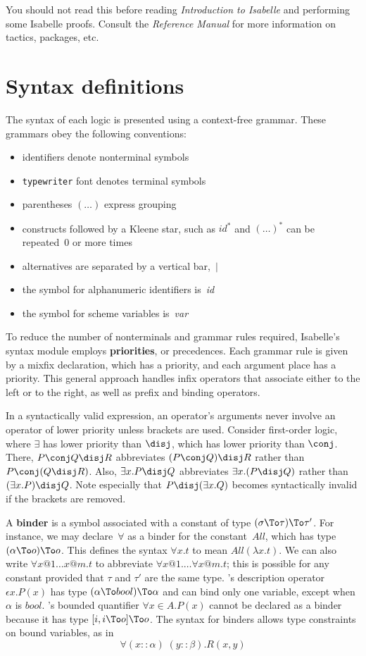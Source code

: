 You should not read this before reading {\em Introduction to Isabelle\/}
and performing some Isabelle proofs.  Consult the {\em Reference Manual}
for more information on tactics, packages, etc.


\section{Syntax definitions}
The syntax of each logic is presented using a context-free grammar.
These grammars obey the following conventions:
\begin{itemize}
\item identifiers denote nonterminal symbols
\item {\tt typewriter} font denotes terminal symbols
\item parentheses $(\ldots)$ express grouping
\item constructs followed by a Kleene star, such as $id^*$ and $(\ldots)^*$
can be repeated~0 or more times 
\item alternatives are separated by a vertical bar,~$|$
\item the symbol for alphanumeric identifiers is~{\it id\/} 
\item the symbol for scheme variables is~{\it var}
\end{itemize}
To reduce the number of nonterminals and grammar rules required, Isabelle's
syntax module employs {\bf priorities}, or precedences.
Each grammar rule is given by a mixfix declaration, which has a priority,
and each argument place has a priority.  This general approach handles
infix operators that associate either to the left or to the right, as well
as prefix and binding operators.

In a syntactically valid expression, an operator's arguments never involve
an operator of lower priority unless brackets are used.  Consider
first-order logic, where $\exists$ has lower priority than $\disj$,
which has lower priority than $\conj$.  There, $P\conj Q \disj R$
abbreviates $(P\conj Q) \disj R$ rather than $P\conj (Q\disj R)$.  Also,
$\exists x.P\disj Q$ abbreviates $\exists x.(P\disj Q)$ rather than
$(\exists x.P)\disj Q$.  Note especially that $P\disj(\exists x.Q)$
becomes syntactically invalid if the brackets are removed.

A {\bf binder} is a symbol associated with a constant of type
$(\sigma\To\tau)\To\tau'$.  For instance, we may declare~$\forall$ as a
binder for the constant~$All$, which has type $(\alpha\To o)\To o$.  This
defines the syntax $\forall x.t$ to mean $All(\lambda x.t)$.  We can
also write $\forall x@1\ldots x@m.t$ to abbreviate $\forall x@1.  \ldots
\forall x@m.t$; this is possible for any constant provided that $\tau$ and
$\tau'$ are the same type.  \HOL's description operator $\epsilon x.P(x)$
has type $(\alpha\To bool)\To\alpha$ and can bind only one variable, except
when $\alpha$ is $bool$.  \ZF's bounded quantifier $\forall x\in A.P(x)$
cannot be declared as a binder because it has type $[i, i\To o]\To o$.  The
syntax for binders allows type constraints on bound variables, as in
\[ \forall (x{::}\alpha) \; (y{::}\beta). R(x,y) \]

